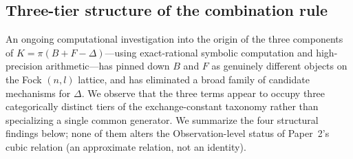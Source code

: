 \documentclass[aps,pra,twocolumn,superscriptaddress,longbibliography]{revtex4-2}
\begin{document}
\subsection{Three-tier structure of the combination rule}
\label{sec:alpha_three_tier}

An ongoing computational investigation into the origin of the three
components of $K = \pi(B + F - \Delta)$---using exact-rational
symbolic computation and high-precision arithmetic---has pinned down
$B$ and $F$ as genuinely different objects on the Fock $(n,l)$
lattice, and has eliminated a broad family of candidate mechanisms
for $\Delta$. We observe that the three terms appear to occupy
three categorically distinct tiers of the exchange-constant
taxonomy rather than specializing a single common generator. We
summarize the four structural findings below; none of them alters
the Observation-level status of Paper~2's cubic relation (an approximate
relation, not an identity).
\end{document}
